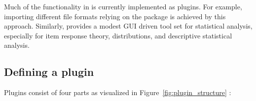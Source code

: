 \documentclass[article,shortnames]{jss}
\begin{document}
Much of the functionality in  is currently implemented as plugins. For example, importing different file
formats relying on the  package is achieved by this approach. Similarly,
 provides a modest GUI driven tool set for statistical analysis,
especially for item response theory, distributions, and descriptive
statistical analysis.

\subsection{Defining a plugin}
\label{sec:technical_plugins_defining}
Plugins consist of four parts as visualized in Figure~\ref{fig:plugin_structure} 
\citep[see Section~\ref{sec:example_plugin} for an example; for a complete
manual, see][]{Friedrichsmeier2010}:
\end{document}
